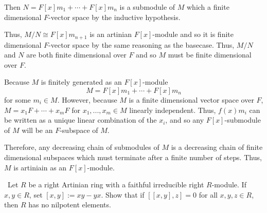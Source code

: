 \documentclass[12pt]{Qual}
\begin{document}
\begin{solution}
Then $N=F[x]m_1+\cdots+F[x]m_n$ is a submodule of $M$ which a finite dimensional $F$-vector space by the inductive hypothesis.

Thus, $M/N\cong F[x]m_{n+1}$ is an artinian $F[x]$-module and so it is finite dimensional $F$-vector space by the same reasoning as the basecase. Thus, $M/N$ and $N$ are both finite dimensional over $F$ and so $M$ must be finite dimensional over $F$.

\boxed{\impliedby} Because $M$ is finitely generated as an $F[x]$-module $$M=F[x]m_1+\cdots+F[x]m_n$$ for some $m_i\in M.$ However, because $M$ is a finite dimensional vector space over $F$, $M=x_1F+\cdots+x_mF$ for $x_1,...,x_m\in M$ linearly independent. Thus, $f(x)m_i$ can be written as a unique linear combination of the $x_i$, and so any $F[x]$-submodule of $M$ will be an $F$-subspace of $M.$

Therefore, any decreasing chain of submodules of $M$ is a decreasing chain of finite dimensional subspaces which must terminate after a finite number of steps. Thus, $M$ is artiniain as an $F[x]$-module.

\end{solution}
\newpage



\begin{problem} $\,$
Let $R$ be a right Artinian ring with a faithful irreducible right $R$-module. If $x,y\in R$, set $[x,y]:=xy-yx$. Show that if $[[x,y],z]=0$ for all $x,y,z\in R$, then $R$ has no nilpotent elements.
\end{problem}
\end{document}
